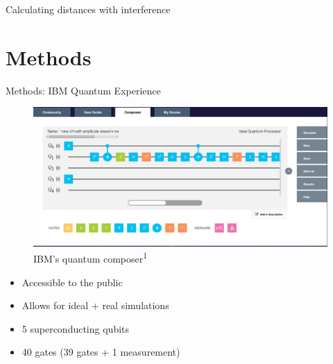 \documentclass[10pt]{beamer}
\begin{document}
{
\begin{frame}[fragile]{Calculating distances with interference}


\end{frame}
}

\section{Methods}

{
\begin{frame}[fragile]{Methods: IBM Quantum Experience}

\begin{figure}
\includegraphics[height=0.45\textwidth]{IBMamplitudecomposer.png}
       \caption{\footnotesize{IBM's quantum composer\textsuperscript{1}} }
\end{figure}
\vspace{-5mm}
\begin{minipage}[t]{.5\textwidth}
\begin{itemize}
\item Accessible to the public
\item Allows for ideal + real simulations
\end{itemize}
\end{minipage}%
\begin{minipage}[t]{.5\textwidth}
\begin{itemize}
\item 5 superconducting qubits
\item 40 gates (39 gates + 1 measurement)

\end{itemize}
\end{minipage}

\end{frame}
}
\end{document}
